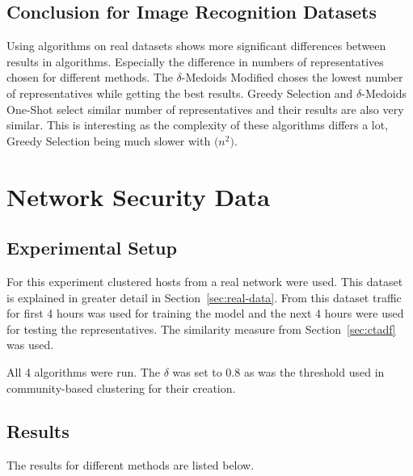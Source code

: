 \documentclass[thesis=B,english]{FITthesis}[2012/10/20]
\begin{document}
\subsection{Conclusion for Image Recognition Datasets}
Using algorithms on real datasets shows more significant differences between results in algorithms.
Especially the difference in numbers of representatives chosen for different methods.
The $\delta$-Medoids Modified choses the lowest number of representatives while getting the best results.
Greedy Selection and $\delta$-Medoids One-Shot select similar number of representatives and their results are also very similar.
This is interesting as the complexity of these algorithms differs a lot, Greedy Selection being much slower with $\mathcal(n^2)$.

\section{Network Security Data}\label{sec:exp4}

\subsection{Experimental Setup}
For this experiment clustered hosts from a real network were used.
This dataset is explained in greater detail in Section~\ref{sec:real-data}.
From this dataset traffic for first 4 hours was used for training the model and the next 4 hours were used for testing the representatives.
The similarity measure from Section~\ref{sec:ctadf} was used.

All 4 algorithms were run.
The $\delta$ was set to 0.8 as was the threshold used in community-based clustering for their creation.

\subsection{Results}

The results for different methods are listed below.
\end{document}

